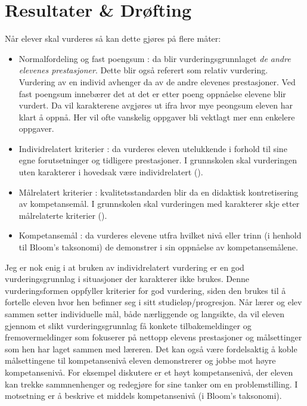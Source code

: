 \documentclass[main.tex]{subfiles}
\begin{document}
\newpage
\section*{Resultater \& Drøfting}
\label{sec:4}

Når elever skal vurderes så kan dette gjøres på flere måter:
\begin{itemize}
\item Normalfordeling og fast poengsum : da blir vurderingsgrunnlaget \emph{de andre elevenes prestasjoner}. 
Dette blir også referert som relativ vurdering. Vurdering av en individ avhenger da av de andre
elevenes prestasjoner. Ved fast poengsum innebærer det at det er etter poeng oppnåelse elevene blir vurdert. 
Da vil karakterene avgjøres ut ifra hvor mye peongsum eleven har klart å oppnå. Her vil ofte vanskelig oppgaver
bli vektlagt mer enn enkelere oppgaver.
\item Individrelatert kriterier : da vurderes eleven utelukkende i forhold til sine egne forutsetninger
og tidligere prestasjoner. I grunnskolen skal vurderingen uten karakterer i hovedsak være 
individrelatert  ().
\item Målrelatert kriterier : kvalitetsstandarden blir da en didaktisk kontretisering av kompetansemål.
 I grunnskolen skal vurderingen med karakterer skje etter målrelaterte kriterier ().
\item Kompetansemål : da vurderes elevene utfra hvilket nivå eller trinn (i henhold til Bloom's taksonomi) 
                      de demonstrer i sin oppnåelse av kompetansemålene.
\end{itemize}
Jeg er nok enig i at bruken av individrelatert vurdering er en god vurderingsgrunnlag i situasjoner
der karakterer ikke brukes. Denne vurderingsformen oppfyller kriterier for god vurdering,
siden den brukes til å fortelle eleven hvor hen befinner seg i sitt studieløp/progresjon.
Når lærer og elev sammen setter individuelle mål, både nærliggende og langsikte, da vil eleven
gjennom et slikt vurderingsgrunnlag få konkete tilbakemeldinger og fremovermeldinger som 
fokuserer på nettopp elevens prestasjoner og målsettinger som hen har laget sammen med
læreren. Det kan også være fordelsaktig å koble målsettingene til kompetansenivå eleven demonstrerer
og jobbe mot høyre kompetansenivå. For eksempel diskutere er et høyt kompetansenivå, der eleven 
kan trekke sammnenhenger og redegjøre for sine tanker om en problemstilling. I motsetning er
å beskrive et middels kompetansenivå (i Bloom's taksonomi).
\end{document}
